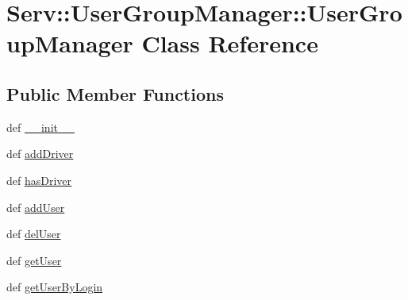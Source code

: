 \hypertarget{class_serv_1_1_user_group_manager_1_1_user_group_manager}{
\section{Serv::UserGroupManager::UserGroupManager Class Reference}
\label{class_serv_1_1_user_group_manager_1_1_user_group_manager}
}
\subsection*{Public Member Functions}
\begin{CompactItemize}
\item 
def \hyperlink{class_serv_1_1_user_group_manager_1_1_user_group_manager_f43f9798f1e93dd8425699ecd6de6c87}{\_\-\_\-init\_\-\_\-}
\item 
def \hyperlink{class_serv_1_1_user_group_manager_1_1_user_group_manager_ea0f7f8d1d6e4d5efce31f3d0ea35fd9}{addDriver}
\item 
def \hyperlink{class_serv_1_1_user_group_manager_1_1_user_group_manager_39ae7245da0bcda25ce712d1b55f2f29}{hasDriver}
\item 
def \hyperlink{class_serv_1_1_user_group_manager_1_1_user_group_manager_46ee225566738a93c7c036b464a931fb}{addUser}
\item 
def \hyperlink{class_serv_1_1_user_group_manager_1_1_user_group_manager_4b747272c8166d17b9458b3f8c4796f0}{delUser}
\item 
def \hyperlink{class_serv_1_1_user_group_manager_1_1_user_group_manager_94bccb5702d504f5b782ba2379aaaab4}{getUser}
\item 
def \hyperlink{class_serv_1_1_user_group_manager_1_1_user_group_manager_ed20d08470748f78a641e6cc5700b505}{getUserByLogin}
\end{CompactItemize}
